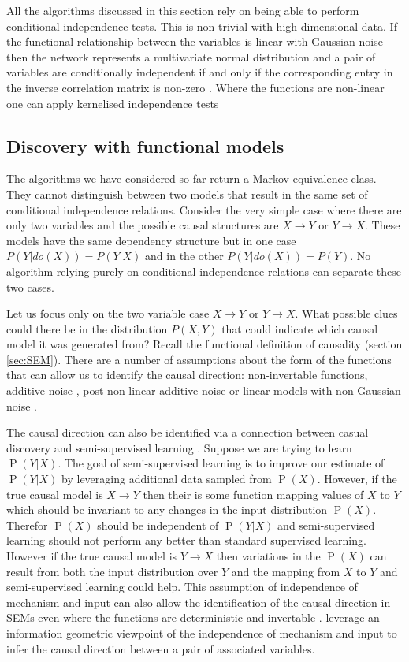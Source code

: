 \documentclass[11pt,a4paper,oneside]{book}
\renewcommand{\P}[1]{\operatorname{P}\left(#1\right)}
\theoremstyle{plain}
\theoremstyle{definition}
\begin{document}
All the algorithms discussed in this section rely on being able to perform conditional independence tests. This is non-trivial with high dimensional data. If the functional relationship between the variables is linear with Gaussian noise then the network represents a multivariate normal distribution and a pair of variables are conditionally independent if and only if the corresponding entry in the inverse correlation matrix is non-zero \citep{Koller2009}. Where the functions are non-linear one can apply kernelised independence tests \citep{Gretton2008,Zhang2012}


\subsection{Discovery with functional models}
The algorithms we have considered so far return a Markov equivalence class. They cannot distinguish between two models that result in the same set of conditional independence relations. Consider the very simple case where  there are only two variables and the possible causal structures are $X \rightarrow Y$ or $Y \rightarrow X$. These models have the same dependency structure but in one case $P(Y|do(X)) = P(Y|X)$ and in the other $P(Y|do(X)) = P(Y)$. No algorithm relying purely on conditional independence relations can separate these two cases. 

Let us focus only on the two variable case $X \rightarrow Y$ or $Y \rightarrow X$. What possible clues could there be in the distribution $P(X,Y)$ that could indicate which causal model it was generated from? Recall the functional definition of causality (section \ref{sec:SEM}). There are a number of assumptions about the form of the functions that can allow us to identify the causal direction: non-invertable functions, additive noise \citep{Hoyer2009}, post-non-linear additive noise \citep{Zhang2008a} or linear models with non-Gaussian noise \citep{Hoyer2012}.

The causal direction can also be identified via a connection between casual discovery and semi-supervised learning \citep{Janzing2012}. Suppose we are trying to learn $\P{Y|X}$. The goal of semi-supervised learning is to improve our estimate of $\P{Y|X}$ by leveraging additional data sampled from $\P{X}$. However, if the true causal model is $X \rightarrow Y$ then their is some function mapping values of $X$ to $Y$ which should be invariant to any changes in the input distribution $\P{X}$. Therefor $\P{X}$ should be independent of $\P{Y|X}$ and semi-supervised learning should not perform any better than standard supervised learning. However if the true causal model is $Y \rightarrow X$ then variations in the $\P{X}$ can result from both the input distribution over $Y$ and the mapping from $X$ to $Y$ and semi-supervised learning could help. This assumption of independence of mechanism and input can also allow the identification of the causal direction in SEMs even where the functions are deterministic and invertable \citep{Daniusis2010}. \citet{Janzing2012a} leverage an information geometric viewpoint of the independence of mechanism and input to infer the causal direction between a pair of associated variables.  
\end{document}
